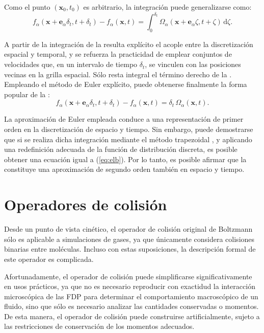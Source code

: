 Como el punto $(\bm{x}_0,t_0)$ es arbitrario, la integraci\'on puede generalizarse como:
\begin{equation}
	f_{\alpha}(\bm{x}+\bm{e}_{\alpha}\delta_t,t+\delta_t)-f_{\alpha}(\bm{x},t)=\int_0^{\delta_t}\Omega_{\alpha}(\bm{x}+\bm{e}_{\alpha}\zeta,t+\zeta) \, \mbox{d}\zeta.
	\label{eq:elb_integral}
\end{equation}

A partir de la integraci\'on de la  resulta expl\'icito el acople entre la discretizaci\'on espacial y temporal, y se refuerza la practicidad de emplear conjuntos de velocidades que, en un intervalo de tiempo $\delta_t$, se vinculen con las posiciones vecinas en la grilla espacial.
S\'olo resta integral el t\'ermino derecho de la . Empleando el m\'etodo de Euler expl\'icito, puede obtenerse finalmente la forma popular de la \lbe{}:
\begin{equation}
	f_{\alpha}(\bm{x}+\bm{e}_{\alpha}\delta_t,t+\delta_t)-f_{\alpha}(\bm{x},t)=\delta_t \, \Omega_{\alpha}(\bm{x},t).
	\label{eq:elb}
\end{equation}

La aproximaci\'on de Euler empleada conduce a una representaci\'on de primer orden en la discretizaci\'on de espacio y tiempo. Sin embargo, puede demostrarse que si se realiza dicha integraci\'on mediante el m\'etodo trapezoidal \cite{he_discrete_1998}, y aplicando una redefinici\'on adecuada de la funci\'on de distribuci\'on discreta, es posible obtener una ecuaci\'on igual a (\ref{eq:elb}). Por lo tanto, es posible afirmar que la  constituye una aproximaci\'on de segundo orden tambi\'en en espacio y tiempo.



\section{Operadores de colisi\'on}

Desde un punto de vista cin\'etico, el operador de colisi\'on original de Boltzmann s\'olo es aplicable a simulaciones de gases, ya que \'unicamente considera colisiones binarias entre mol\'eculas. Incluso con estas suposiciones, la descripci\'on formal de este operador es complicada.
\par 
Afortunadamente, el operador de colisi\'on puede simplificarse significativamente en usos pr\'acticos, ya que no es necesario reproducir con exactidud la interacci\'on microsc\'opica de las FDP para determinar el comportamiento macrosc\'opico de un fluido, sino que s\'olo es necesario analizar las cantidades conservadas o momentos. De esta manera, el operador de colisi\'on puede construirse artificialmente, sujeto a las restricciones de conservaci\'on de los momentos adecuados.


